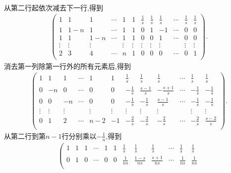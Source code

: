 \documentclass[lang=cn,newtx,10pt,scheme=chinese]{elegantbook}
\begin{document}
\begin{solution}
\begin{gather*}
    \end{gather*}
    从第二行起依次减去下一行,得到
    \begin{gather*}
        \left( \begin{matrix}
            1&		1&		1&		\cdots&		1&		1&		\frac{1}{s}&		\frac{1}{s}&		\frac{1}{s}&		\cdots&		\frac{1}{s}&		\frac{1}{s}\\
            1&		1-n&		1&		\cdots&		1&		1&		0&		1&		-1&		\cdots&		0&		0\\
            1&		1&		1-n&		\cdots&		1&		1&		0&		0&		1&		\cdots&		0&		0\\
            \vdots&		\vdots&		\vdots&		&		\vdots&		\vdots&		\vdots&		\vdots&		\vdots&		&		\vdots&		\vdots\\
            2&		3&		4&		\cdots&		n&		1&		0&		0&		0&		\cdots&		0&		1\\
        \end{matrix} \right) .
    \end{gather*}
    消去第一列除第一行外的所有元素后,得到
    \begin{gather*}
        \left( \begin{matrix}
            1&		1&		1&		\cdots&		1&		1&		\frac{1}{s}&		\frac{1}{s}&		\frac{1}{s}&		\cdots&		\frac{1}{s}&		\frac{1}{s}\\
            0&		-n&		0&		\cdots&		0&		0&		-\frac{1}{s}&		\frac{s-1}{s}&		-\frac{s+1}{s}&		\cdots&		-\frac{1}{s}&		-\frac{1}{s}\\
            0&		0&		-n&		\cdots&		0&		0&		-\frac{1}{s}&		-\frac{1}{s}&		\frac{s-1}{s}&		\cdots&		-\frac{1}{s}&		-\frac{1}{s}\\
            \vdots&		\vdots&		\vdots&		&		\vdots&		\vdots&		\vdots&		\vdots&		\vdots&		&		\vdots&		\vdots\\
            0&		1&		2&		\cdots&		n-2&		-1&		-\frac{2}{s}&		-\frac{2}{s}&		-\frac{2}{s}&		\cdots&		-\frac{2}{s}&		\frac{s-2}{s}\\
        \end{matrix} \right) .
    \end{gather*}
    从第二行到第\(n - 1\)行分别乘以\(-\frac{1}{n}\),得到
    \begin{gather*}
        \left( \begin{matrix}
            1&		1&		1&		\cdots&		1&		1&		\frac{1}{s}&		\frac{1}{s}&		\frac{1}{s}&		\cdots&		\frac{1}{s}&		\frac{1}{s}\\
            0&		1&		0&		\cdots&		0&		0&		\frac{1}{ns}&		\frac{1-s}{ns}&		\frac{s+1}{ns}&		\cdots&		\frac{1}{ns}&		\frac{1}{ns}\\

\end{matrix}
\end{gather*}
\end{solution}
\end{document}
